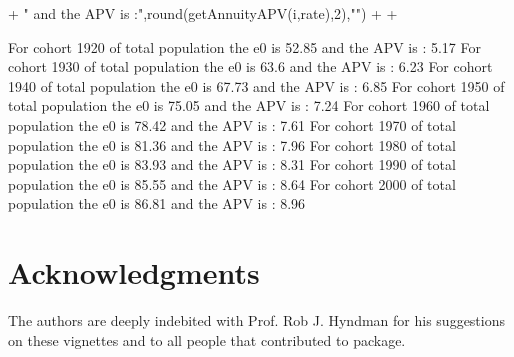 \documentclass[nojss]{jss}
\begin{document}
\begin{Schunk}
\begin{Sinput}
{+  		" and the APV is :",round(getAnnuityAPV(i,rate),2),"\n")
+  		
+  	}
\end{Sinput}
\begin{Soutput}
For cohort  1920 of total population the e0 is 52.85  and the APV is : 5.17 
For cohort  1930 of total population the e0 is 63.6  and the APV is : 6.23 
For cohort  1940 of total population the e0 is 67.73  and the APV is : 6.85 
For cohort  1950 of total population the e0 is 75.05  and the APV is : 7.24 
For cohort  1960 of total population the e0 is 78.42  and the APV is : 7.61 
For cohort  1970 of total population the e0 is 81.36  and the APV is : 7.96 
For cohort  1980 of total population the e0 is 83.93  and the APV is : 8.31 
For cohort  1990 of total population the e0 is 85.55  and the APV is : 8.64 
For cohort  2000 of total population the e0 is 86.81  and the APV is : 8.96 
\end{Soutput}
\end{Schunk}


\section*{Acknowledgments}\label{sec:acknowledgments}

The authors are deeply indebited with Prof. Rob J. Hyndman for his suggestions on these vignettes and to all people that contributed to  package.



\end{document}
